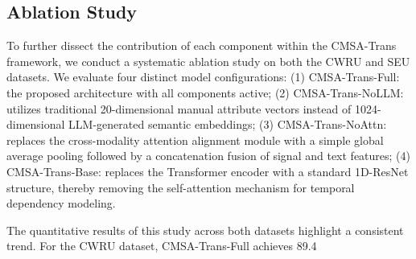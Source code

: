 \subsection{Ablation Study}
To further dissect the contribution of each component within the CMSA-Trans framework, we conduct a systematic ablation study on both the CWRU and SEU datasets. We evaluate four distinct model configurations: (1) CMSA-Trans-Full: the proposed architecture with all components active; (2) CMSA-Trans-NoLLM: utilizes traditional 20-dimensional manual attribute vectors instead of 1024-dimensional LLM-generated semantic embeddings; (3) CMSA-Trans-NoAttn: replaces the cross-modality attention alignment module with a simple global average pooling followed by a concatenation fusion of signal and text features; (4) CMSA-Trans-Base: replaces the Transformer encoder with a standard 1D-ResNet structure, thereby removing the self-attention mechanism for temporal dependency modeling.

The quantitative results of this study across both datasets highlight a consistent trend. For the CWRU dataset, CMSA-Trans-Full achieves 89.4%

